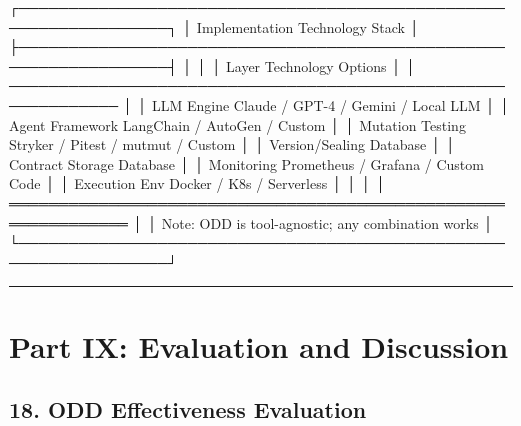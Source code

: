 \documentclass[
]{article}
\newenvironment{Shaded}{}{}
\newcommand{\NormalTok}[1]{#1}
\begin{document}
\begin{Shaded}
\begin{Highlighting}[]
\NormalTok{┌─────────────────────────────────────────────────────────────────┐}
\NormalTok{│                 Implementation Technology Stack                  │}
\NormalTok{├─────────────────────────────────────────────────────────────────┤}
\NormalTok{│                                                                  │}
\NormalTok{│  Layer              Technology Options                          │}
\NormalTok{│  ─────────────────────────────────────────────────────────────  │}
\NormalTok{│  LLM Engine         Claude / GPT{-}4 / Gemini / Local LLM        │}
\NormalTok{│  Agent Framework    LangChain / AutoGen / Custom                │}
\NormalTok{│  Mutation Testing   Stryker / Pitest / mutmut / Custom          │}
\NormalTok{│  Version/Sealing    Database                                    │}
\NormalTok{│  Contract Storage   Database                                    │}
\NormalTok{│  Monitoring         Prometheus / Grafana / Custom Code          │}
\NormalTok{│  Execution Env      Docker / K8s / Serverless                   │}
\NormalTok{│                                                                  │}
\NormalTok{│  ══════════════════════════════════════════════════════════════  │}
\NormalTok{│  Note: ODD is tool{-}agnostic; any combination works              │}
\NormalTok{└─────────────────────────────────────────────────────────────────┘}
\end{Highlighting}
\end{Shaded}

\begin{center}\rule{0.5\linewidth}{0.5pt}\end{center}

\hypertarget{part-ix-evaluation-and-discussion}{%
\section{Part IX: Evaluation and
Discussion}\label{part-ix-evaluation-and-discussion}}

\hypertarget{18-odd-effectiveness-evaluation}{%
\subsection{18. ODD Effectiveness
Evaluation}\label{18-odd-effectiveness-evaluation}}
\end{document}
